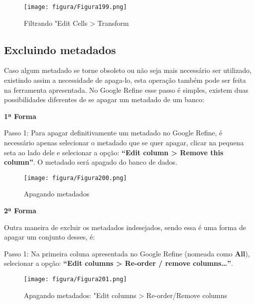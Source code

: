 \documentclass[12pt,hidelinks]{article}
\begin{document}
    \begin{figure}[!htp]
                \centering
                \texttt{[image: figura/Figura199.png]}
                \caption{Filtrando "Edit Cells > Transform}
            \label{Rotulo}
        \end{figure}
    
\newpage
    
    \subsection{Excluindo metadados}
    
    Caso algum metadado se torne obsoleto ou não seja mais necessário ser utilizado, existindo assim a necessidade de apaga-lo, esta operação também pode ser feita na ferramenta apresentada. No Google Refine esse passo é simples, existem duas possibilidades diferentes de se apagar um metadado de um banco: 
    
    \singlespacing
    
    \textbf{1ª Forma}
    
    \singlespacing
    
    Passo 1: Para apagar definitivamente um metadado no Google Refine, é necessário apenas selecionar o metadado que se quer apagar, clicar na pequena seta ao lado dele e selecionar a opção: \textbf{“Edit column > Remove this column”}. O metadado será apagado do banco de dados.
    
    \begin{figure}[!htp]
                \centering
                \texttt{[image: figura/Figura200.png]}
                \caption{Apagando metadados}
            \label{Rotulo}
        \end{figure}
    
    \textbf{2ª Forma}
    
    Outra maneira de excluir os metadados indesejados, sendo essa é uma forma de apagar um conjunto desses, é: 
    
    \singlespacing
    
    Passo 1: Na primeira coluna apresentada no Google Refine (nomeada como \textbf{All}), selecionar a opção: \textbf{“Edit columns > Re-order / remove columns…”}.
    
\newpage

    \begin{figure}[!htp]
                \centering
                \texttt{[image: figura/Figura201.png]}
                \caption{ Apagando metadados: "Edit columns > Re-order/Remove columns}
            \label{Rotulo}
        \end{figure}
    
\end{document}
